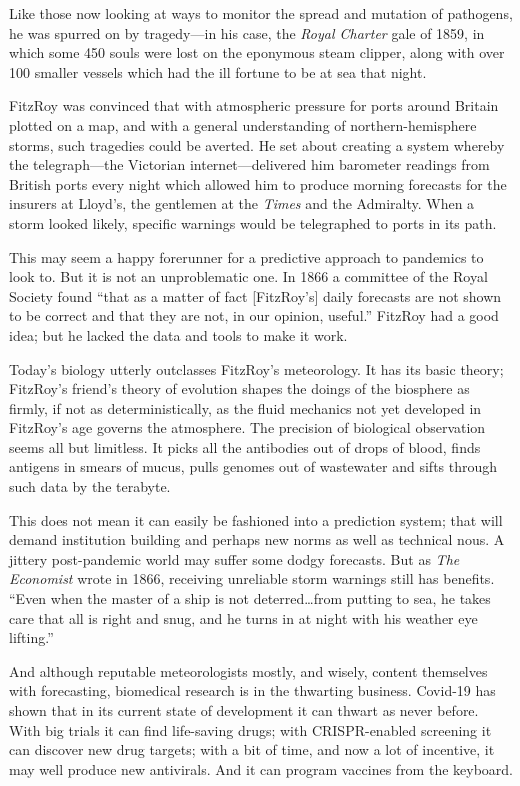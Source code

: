 \documentclass{article}
\begin{document}
Like those now looking at ways to monitor the spread and mutation of pathogens, he was spurred on by tragedy---in his case, the \emph{Royal Charter} gale of 1859, in which some 450 souls were lost on the eponymous steam clipper, along with over 100 smaller vessels which had the ill fortune to be at sea that night. 

FitzRoy was convinced that with atmospheric pressure for ports around Britain plotted on a map, and with a general understanding of northern-hemisphere storms, such tragedies could be averted. He set about creating a system whereby the telegraph---the Victorian internet---delivered him barometer readings from British ports every night which allowed him to produce morning forecasts for the insurers at Lloyd's, the gentlemen at the \emph{Times} and the Admiralty. When a storm looked likely, specific warnings would be telegraphed to ports in its path. 

This may seem a happy forerunner for a predictive approach to pandemics to look to. But it is not an unproblematic one. In 1866 a committee of the Royal Society found ``that as a matter of fact {[}FitzRoy's{]} daily forecasts are not shown to be correct and that they are not, in our opinion, useful.'' FitzRoy had a good idea; but he lacked the data and tools to make it work. 

Today's biology utterly outclasses FitzRoy's meteorology. It has its basic theory; FitzRoy's friend's theory of evolution shapes the doings of the biosphere as firmly, if not as deterministically, as the fluid mechanics not yet developed in FitzRoy's age governs the atmosphere. The precision of biological observation seems all but limitless. It picks all the antibodies out of drops of blood, finds antigens in smears of mucus, pulls genomes out of wastewater and sifts through such data by the terabyte. 

This does not mean it can easily be fashioned into a prediction system; that will demand institution building and perhaps new norms as well as technical nous. A jittery post-pandemic world may suffer some dodgy forecasts. But as \emph{The Economist} wrote in 1866, receiving unreliable storm warnings still has benefits. ``Even when the master of a ship is not deterred\ldots{}from putting to sea, he takes care that all is right and snug, and he turns in at night with his weather eye lifting.'' 

And although reputable meteorologists mostly, and wisely, content themselves with forecasting, biomedical research is in the thwarting business. Covid-19 has shown that in its current state of development it can thwart as never before. With big trials it can find life-saving drugs; with CRISPR-enabled screening it can discover new drug targets; with a bit of time, and now a lot of incentive, it may well produce new antivirals. And it can program vaccines from the keyboard. 
\end{document}
